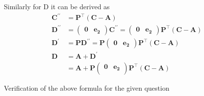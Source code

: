 \documentclass[12pt]{article}
\providecommand{\brak}[1]{\ensuremath{\left(#1\right)}}
\newcommand{\myvec}[1]{\ensuremath{\begin{pmatrix}#1\end{pmatrix}}}
\let\vec\mathbf
\begin{document}
Similarly for D it can be derived as
\begin{align}
\vec{C^{\prime\prime}} &= \vec{P}^\top \brak{\vec{C} - \vec{A}}\\
\vec{D^{\prime\prime}} &= \myvec{
\vec{0} & \vec{e_{2}}
}\vec{C^{\prime\prime}} = \myvec{
\vec{0} & \vec{e_{2}}
}\vec{P}^\top \brak{\vec{C} - \vec{A}}\\
\vec{D^{\prime}} &= \vec{P} \vec{D^{\prime\prime}} = \vec{P} \myvec{
\vec{0} & \vec{e_{2}}
}\vec{P}^\top \brak{\vec{C} - \vec{A}}\\
\vec{D} &= \vec{A}+\vec{D^{\prime}}\\
 &= \vec{A} + \vec{P}\myvec{
\vec{0}&\vec{e_{2}}\\
}
\vec{P}^\top\brak{\vec{C}-\vec{A}}
\end{align}


Verification of the above formula for the given question
\end{document}
